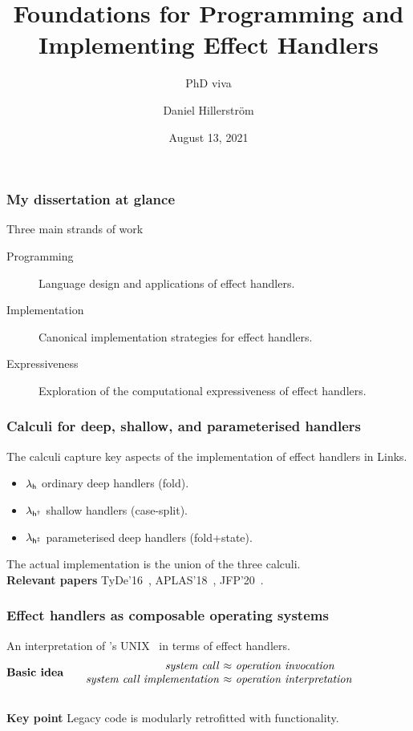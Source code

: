\documentclass[169,10pt,compress,dvipsnames]{beamer}
\author{Daniel Hillerström}
\title{Foundations for Programming and Implementing Effect Handlers}
\institute{The University of Edinburgh, Scotland UK}
\subtitle{PhD viva}
\date{August 13, 2021}
\begin{document}
%
%
\begin{frame}
  \maketitle
\end{frame}

\begin{frame}
  \frametitle{My dissertation at glance}

  Three main strands of work

  \begin{description}
  \item[Programming] Language design and applications of effect handlers.
  \item[Implementation] Canonical implementation strategies for effect handlers.
  \item[Expressiveness] Exploration of the computational expressiveness of effect handlers.
  \end{description}
\end{frame}

\begin{frame}
  \frametitle{Calculi for deep, shallow, and parameterised handlers}

  The calculi capture key aspects of the implementation of effect
  handlers in Links.

  \begin{itemize}
    \item $\lambda_{\mathsf{h}}$ ordinary deep handlers (fold).
    \item $\lambda_{\mathsf{h^\dagger}}$ shallow handlers (case-split).
    \item $\lambda_{\mathsf{h^{\ddagger}}}$ parameterised deep handlers (fold+state).
  \end{itemize}

  The actual implementation is the union of the three calculi.\\[2em]

  \textbf{Relevant papers} TyDe'16~\cite{HillerstromL16},
  APLAS'18~\cite{HillerstromL18}, JFP'20~\cite{HillerstromLA20}.
\end{frame}

\begin{frame}
  \frametitle{Effect handlers as composable operating systems}

  An interpretation of \citeauthor{RitchieT74}'s
  UNIX~\cite{RitchieT74} in terms of effect handlers.\\[2em]

  \[
    \bl
    \!\!\!\!\!\!\!\!\!\!\!\!\!\!\!\!\!\!\!\!\!\!\!\!\!\!\!\!\textbf{Basic idea}
      \ba[m]{@{\qquad}r@{~}c@{~}l}
        \text{\emph{system call}} &\approx& \text{\emph{operation invocation}}\\
        \text{\emph{system call implementation}} &\approx& \text{\emph{operation interpretation}}
      \ea
    \el
  \]\hfill\\[2em]

  \textbf{Key point} Legacy code is modularly retrofitted with functionality.
\end{frame}
\end{document}
